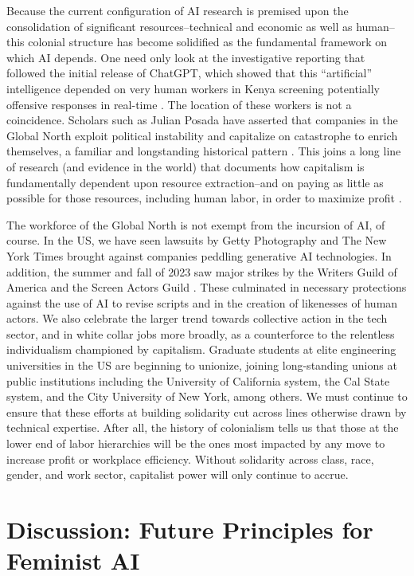 Because the current configuration of AI research is premised upon the consolidation of significant resources–technical and economic as well as human–this colonial structure has become solidified as the fundamental framework on which AI depends. One need only look at the investigative reporting that followed the initial release of ChatGPT, which showed that this “artificial” intelligence depended on very human workers in Kenya screening potentially offensive responses in real-time \cite{Exclusive_2023}. 
The location of these workers is not a coincidence. Scholars such as Julian Posada have asserted that companies in the Global North exploit political instability and capitalize on catastrophe to enrich themselves, a familiar and longstanding historical pattern \cite{Posada_2022}. This joins a long line of research (and evidence in the world) that documents how capitalism is fundamentally dependent upon resource extraction–and on paying as little as possible for those resources, including human labor, in order to maximize profit \cite{Ricaurte2019, Couldry_Mejias_2019}. 

The workforce of the Global North is not exempt from the incursion of AI, of course. In the US, we have seen lawsuits by Getty Photography and The New York Times brought against companies peddling generative AI technologies. In addition, the summer and fall of 2023 saw major strikes by the Writers Guild of America \cite{How_Hollywood} and the Screen Actors Guild \cite{Hollywood_Actors}. These culminated in necessary protections against the use of AI to revise scripts and in the creation of likenesses of human actors. We also celebrate the larger trend towards collective action in the tech sector, and in white collar jobs more broadly, as a counterforce to the relentless individualism championed by capitalism. Graduate students at elite engineering universities in the US are beginning to unionize, joining long-standing unions at public institutions including the University of California system, the Cal State system, and the City University of New York, among others. We must continue to ensure that these efforts at building solidarity cut across lines otherwise drawn by technical expertise. After all, the history of colonialism tells us that those at the lower end of labor hierarchies will be the ones most impacted by any move to increase profit or workplace efficiency. Without solidarity across class, race, gender, and work sector, capitalist power will only continue to accrue.  

\section{Discussion: Future Principles for Feminist AI}

